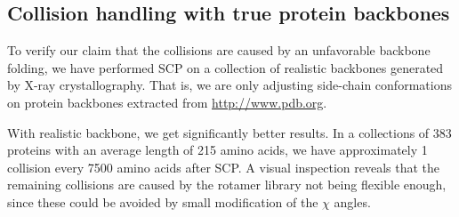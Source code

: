 \subsection{Collision handling with true protein backbones}
To verify our claim that the collisions are caused by an unfavorable backbone folding, we have performed SCP on a collection of realistic backbones generated by X-ray crystallography.
That is, we are only adjusting side-chain conformations on protein backbones extracted from \url{http://www.pdb.org}. 

With realistic backbone, we get significantly better results.
In a collections of 383 proteins with an average length of 215 amino acids, we have approximately 1 collision every 7500 amino acids after SCP.
A visual inspection reveals that the remaining collisions are caused by the rotamer library not being flexible enough, since these could be avoided by small modification of the $\chi$ angles.


